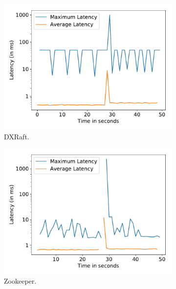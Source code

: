 \begin{figure}[t]
	\centering
	\begin{subfigure}[t]{0.49\textwidth}
		\includegraphics[width=\textwidth]{img/leader_crash_dxraft.pdf}
		\caption{DXRaft.}
	\end{subfigure}
	\begin{subfigure}[t]{0.49\textwidth}
		\includegraphics[width=\textwidth]{img/leader_crash_zk.pdf}
		\caption{Zookeeper.}
	\end{subfigure}
	\begin{subfigure}[t]{0.49\textwidth}

\end{subfigure}
\end{figure}
